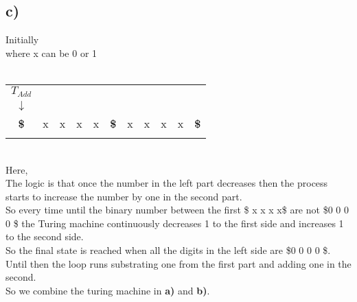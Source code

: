 \documentclass{article}
\begin{document}
\subsection*{\textbf{c)}}
Initially \\
where x can be 0 or 1 \\\\
\begin{tabular}{c c c c c c c c c c c}
     $T_{Add}$\\ $\downarrow$&&&&&&&&&&\\
     \hline
     \textbf{\$} & x & x & x & x &\textbf{\$} & x & x & x & x &\textbf{\$}  \\
     \hline\\
\end{tabular}\\
Here,\\
The logic is that once the number in the left part  decreases then the process starts to increase the number by one in the second part.\\
So every time until the binary number between the first \$ x x x x\$ are not \$0 0 0 0 \$ the Turing machine continuously decreases 1 to the first side and increases 1 to the second side.\\
So the final state is reached when all the digits in the left side are \$0 0 0 0 \$.\\
Until then the loop runs substrating one from the first part and adding one in the second.\\
So we combine the turing machine in \textbf{a)} and \textbf{b)}.
\end{document}
